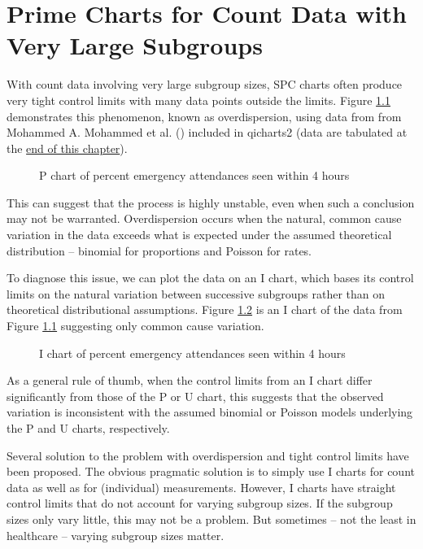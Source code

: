 \documentclass[
]{book}
\makeatletter
\newcommand*\pandocbounded[1]{%
  \sbox\pandoc@box{#1}%
  \Gscale@div\@tempa{\textheight}{\dimexpr\ht\pandoc@box+\dp\pandoc@box\relax}%
  \Gscale@div\@tempb{\linewidth}{\wd\pandoc@box}%
  \ifdim\@tempb\p@<\@tempa\p@\let\@tempa\@tempb\fi%
  \ifdim\@tempa\p@<\p@\scalebox{\@tempa}{\usebox\pandoc@box}%
  \else\usebox{\pandoc@box}%
  \fi%
}
\makeatother
\begin{document}
\chapter{Prime Charts for Count Data with Very Large Subgroups}\label{prime-charts-for-count-data-with-very-large-subgroups}

With count data involving very large subgroup sizes, SPC charts often produce very tight control limits with many data points outside the limits.
Figure \ref{fig:pcharts-fig1} demonstrates this phenomenon, known as overdispersion, using data from from Mohammed A. Mohammed et al. () included in qicharts2 (data are tabulated at the \hyperref[pp-data]{end of this chapter}).

\begin{figure}
\centering
\pandocbounded{}
\caption{\label{fig:pcharts-fig1}P chart of percent emergency attendances seen within 4 hours}
\end{figure}

This can suggest that the process is highly unstable, even when such a conclusion may not be warranted. Overdispersion occurs when the natural, common cause variation in the data exceeds what is expected under the assumed theoretical distribution -- binomial for proportions and Poisson for rates.

To diagnose this issue, we can plot the data on an I chart, which bases its control limits on the natural variation between successive subgroups rather than on theoretical distributional assumptions. Figure \ref{fig:pcharts-fig2} is an I chart of the data from Figure \ref{fig:pcharts-fig1} suggesting only common cause variation.

\begin{figure}
\centering
\pandocbounded{}
\caption{\label{fig:pcharts-fig2}I chart of percent emergency attendances seen within 4 hours}
\end{figure}

As a general rule of thumb, when the control limits from an I chart differ significantly from those of the P or U chart, this suggests that the observed variation is inconsistent with the assumed binomial or Poisson models underlying the P and U charts, respectively.

Several solution to the problem with overdispersion and tight control limits have been proposed. The obvious pragmatic solution is to simply use I charts for count data as well as for (individual) measurements. However, I charts have straight control limits that do not account for varying subgroup sizes. If the subgroup sizes only vary little, this may not be a problem. But sometimes -- not the least in healthcare -- varying subgroup sizes matter.
\end{document}
